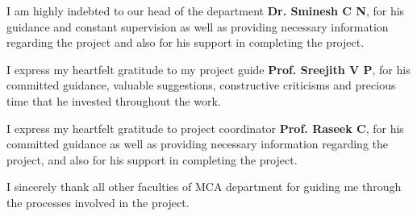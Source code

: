 \begin{justify}

\hspace{0.5cm}I am highly indebted to our head of the department \textbf{Dr. Sminesh C N}, for his guidance and constant supervision as well as providing necessary information regarding the project and also for his support in completing the project. 
\end{justify}

\begin{justify}

\hspace{0.5cm}I express my heartfelt gratitude to my project guide \textbf{Prof. Sreejith V P}, for his committed guidance, valuable suggestions, constructive
criticisms and precious time that he invested throughout the work.
\end{justify}

\begin{justify}

\hspace{0.5cm}I express my heartfelt gratitude to project coordinator \textbf{Prof. Raseek C}, for his committed guidance as well as providing necessary information regarding the project, and also for his support in completing the project.
\end{justify}

\begin{justify}
    
\hspace{0.5cm}I sincerely thank all other faculties of MCA department for guiding me through the processes involved in the project.
\end{justify}

\newpage